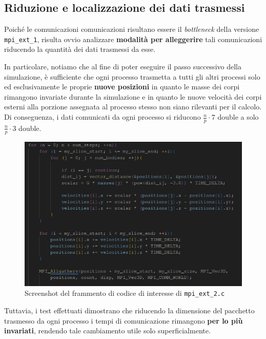 \documentclass[12pt]{report}
\begin{document}
    \newpage

    \subsection{Riduzione e localizzazione dei dati trasmessi}

    Poiché le comunicazioni comunicazioni risultano essere il \textit{bottleneck} della versione \texttt{mpi\_ext\_1}, risulta ovvio analizzare \textbf{modalità per alleggerire} tali comunicazioni riducendo la quantità dei dati trasmessi da esse.
    
    In particolare, notiamo che al fine di poter eseguire il passo successivo della simulazione, è sufficiente che ogni processo trasmetta a tutti gli altri processi solo ed esclusivamente le proprie \textbf{nuove posizioni} in quanto le masse dei corpi rimangono invariate durante la simulazione e in quanto le nuove velocità dei corpi esterni alla porzione assegnata al processo stesso non siano rilevanti per il calcolo. Di conseguenza, i dati comunicati da ogni processo si riducono $\frac{n}{p} \cdot 7$ double a solo $\frac{n}{p} \cdot 3$ double.

    \begin{figure}[H]
        \centering
        \includegraphics[width=\textwidth]{images/mpi_ext_2.png}
        \caption{Screenshot del frammento di codice di interesse di \texttt{mpi\_ext\_2.c}}
        \label{fig:mpi_ext_2}
    \end{figure}
    
    Tuttavia, i test effettuati dimostrano che riducendo la dimensione del pacchetto trasmesso da ogni processo i tempi di comunicazione rimangono \textbf{per lo più invariati}, rendendo tale cambiamento utile solo superficialmente.
\end{document}
